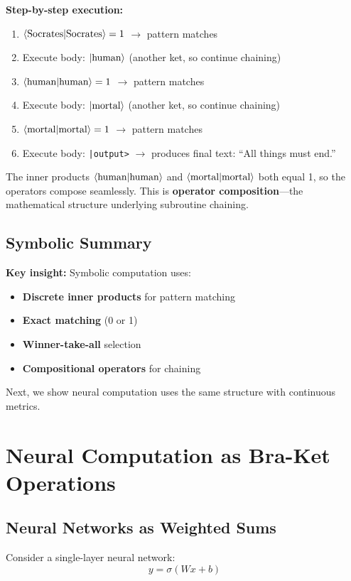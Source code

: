 \documentclass[11pt,a4paper]{article}
\theoremstyle{definition}
\begin{document}
\textbf{Step-by-step execution:}
\begin{enumerate}
\item $\braket{\text{Socrates}|\text{Socrates}} = 1$ $\to$ pattern matches
\item Execute body: $\ket{\text{human}}$ (another ket, so continue chaining)
\item $\braket{\text{human}|\text{human}} = 1$ $\to$ pattern matches
\item Execute body: $\ket{\text{mortal}}$ (another ket, so continue chaining)
\item $\braket{\text{mortal}|\text{mortal}} = 1$ $\to$ pattern matches
\item Execute body: \texttt{|output>} $\to$ produces final text: ``All things must end.''
\end{enumerate}

The inner products $\braket{\text{human}|\text{human}}$ and $\braket{\text{mortal}|\text{mortal}}$ both equal 1, so the operators compose seamlessly. This is \textbf{operator composition}---the mathematical structure underlying subroutine chaining.

\subsection{Symbolic Summary}

\textbf{Key insight:} Symbolic computation uses:
\begin{itemize}
\item \textbf{Discrete inner products} for pattern matching
\item \textbf{Exact matching} (0 or 1)
\item \textbf{Winner-take-all} selection
\item \textbf{Compositional operators} for chaining
\end{itemize}

Next, we show neural computation uses the same structure with continuous metrics.

\section{Neural Computation as Bra-Ket Operations}

\subsection{Neural Networks as Weighted Sums}

Consider a single-layer neural network:
\begin{equation}
y = \sigma(Wx + b)
\end{equation}
\end{document}
